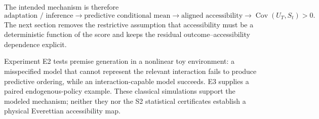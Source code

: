 The intended mechanism is therefore
\[
\text{adaptation / inference}
\rightarrow
\text{predictive conditional mean}
\rightarrow
\text{aligned accessibility}
\rightarrow
\operatorname{Cov}(U_T,S_t)>0.
\]
The next section removes the restrictive assumption that accessibility must be a deterministic function of the score and keeps the residual outcome--accessibility dependence explicit.

Experiment E2 tests premise generation in a nonlinear toy environment: a misspecified model that cannot represent the relevant interaction fails to produce predictive ordering, while an interaction-capable model succeeds. E3 supplies a paired endogenous-policy example. These classical simulations support the modeled mechanism; neither they nor the S2 statistical certificates establish a physical Everettian accessibility map.
